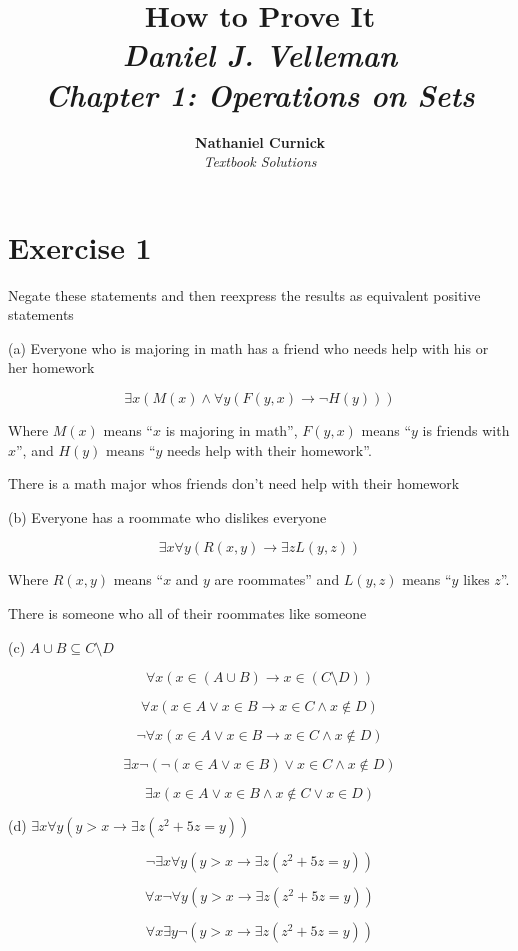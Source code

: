 \documentclass[11pt]{article}
\title{\textbf{How to Prove It} \\ {\Large\itshape Daniel J. Velleman} \\ {\Large\itshape Chapter 1: Operations on Sets}}
\author{\textbf{Nathaniel Curnick} \\ \textit{Textbook Solutions}}
\date{}
\newcommand{\then}{\rightarrow}
\begin{document}
\maketitle

\section*{Exercise 1}

Negate these statements and then reexpress the results as equivalent positive
statements

\noindent (a) Everyone who is majoring in math has a friend who needs help with 
his or her homework

$$\exists x (M(x) \wedge \forall y (F(y, x) \then \neg H(y)))$$

Where $M(x)$ means ``$x$ is majoring in math'',
$F(y,x)$ means ``$y$ is friends with $x$'',
and $H(y)$ means ``$y$ needs help with their homework''.

There is a math major whos friends don't need help with their homework

\noindent (b) Everyone has a roommate who dislikes everyone

$$\exists x \forall y (R(x, y) \then \exists z L(y, z))$$

Where $R(x, y)$ means ``$x$ and $y$ are roommates'' and 
$L(y, z)$ means ``$y$ likes $z$''.

There is someone who all of their roommates like someone

\noindent (c) $A \cup B \subseteq C \setminus D$

$$\forall x (x \in (A \cup B) \then x \in (C \setminus D))$$

$$\forall x (x \in A \vee x \in B \then x \in C \wedge x \notin D)$$

$$\neg \forall x (x \in A \vee x \in B \then x \in C \wedge x \notin D)$$

$$\exists x \neg (\neg(x \in A \vee x \in B) \vee x \in C \wedge x \notin D)$$

$$\exists x (x \in A \vee x \in B \wedge x \notin C \vee x \in D)$$

\noindent (d) $\exists x \forall y (y > x \then \exists z (z^2 + 5z = y))$

$$\neg \exists x \forall y (y > x \then \exists z(z^2 + 5z = y))$$

$$\forall x \neg \forall y (y > x \then \exists z (z^2 + 5z = y))$$

$$\forall x \exists y \neg (y > x \then \exists z (z^2 + 5z = y))$$
\end{document}
